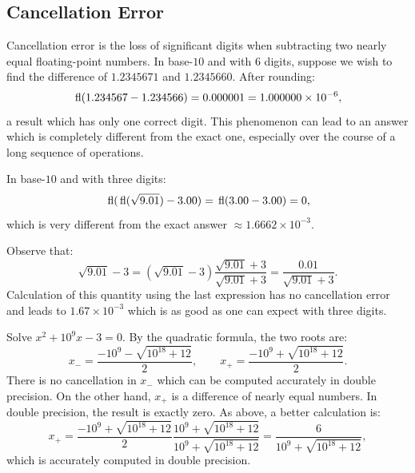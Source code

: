 \subsection{Cancellation Error}

Cancellation error is the loss of significant digits when subtracting two nearly equal floating-point numbers. In base-$10$ and with $6$ digits, suppose we wish to find the difference of $1.2345671$ and $1.2345660$. After rounding:
\[
{\rm\,fl}(1.234567-1.234566) = 0.000001 = 1.000000\times10^{-6},
\]
a result which has only one correct digit. This phenomenon can lead to an answer which is completely different from the exact one, especially over the course of a long sequence of operations.

\begin{example}
In base-$10$ and with three digits:
\[
{\rm\,fl}({\rm\,fl}(\sqrt{9.01})-3.00) = {\rm\,fl}(3.00-3.00) = 0,
\]
which is very different from the exact answer $\approx 1.6662\times10^{-3}$. 

Observe that:
\[
\sqrt{9.01}-3 = (\sqrt{9.01}-3)\dfrac{\sqrt{9.01}+3}{\sqrt{9.01}+3} = \dfrac{0.01}{\sqrt{9.01}+3}.
\]
Calculation of this quantity using the last expression has no cancellation error and leads to $1.67\times10^{-3}$ which is as good as one can expect with three digits.
\end{example}

\begin{example}
Solve $x^2+10^9x-3=0$. By the quadratic formula, the two roots are:
\[
x_- = \dfrac{-10^9-\sqrt{10^{18}+12}}{2},\qquad x_+ = \dfrac{-10^9+\sqrt{10^{18}+12}}{2}.
\]
There is no cancellation in $x_-$ which can be computed accurately in double precision. On the other hand, $x_+$ is a difference of nearly equal numbers. In double precision, the result is exactly zero. As above, a better calculation is:
\[
x_+ = \dfrac{-10^9+\sqrt{10^{18}+12}}{2}\dfrac{10^9+\sqrt{10^{18}+12}}{10^9+\sqrt{10^{18}+12}} = \dfrac{6}{10^9+\sqrt{10^{18}+12}},
\]
which is accurately computed in double precision.
\end{example}

